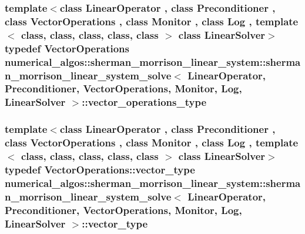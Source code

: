 \hypertarget{classnumerical__algos_1_1sherman__morrison__linear__system_1_1sherman__morrison__linear__system__solve_a737e301e18d9443d9aeb9a07ae87ef51}{
\subsubsection[{vector\-\_\-operations\-\_\-type}]{\setlength{\rightskip}{0pt plus 5cm}template$<$class Linear\-Operator , class Preconditioner , class Vector\-Operations , class Monitor , class Log , template$<$ class, class, class, class, class $>$ class Linear\-Solver$>$ typedef Vector\-Operations {\bf numerical\-\_\-algos\-::sherman\-\_\-morrison\-\_\-linear\-\_\-system\-::sherman\-\_\-morrison\-\_\-linear\-\_\-system\-\_\-solve}$<$ Linear\-Operator, Preconditioner, Vector\-Operations, Monitor, Log, Linear\-Solver $>$\-::{\bf vector\-\_\-operations\-\_\-type}}}\label{classnumerical__algos_1_1sherman__morrison__linear__system_1_1sherman__morrison__linear__system__solve_a737e301e18d9443d9aeb9a07ae87ef51}
\hypertarget{classnumerical__algos_1_1sherman__morrison__linear__system_1_1sherman__morrison__linear__system__solve_aec9272d97681f76dc772bee75ab3c3aa}{
\subsubsection[{vector\-\_\-type}]{\setlength{\rightskip}{0pt plus 5cm}template$<$class Linear\-Operator , class Preconditioner , class Vector\-Operations , class Monitor , class Log , template$<$ class, class, class, class, class $>$ class Linear\-Solver$>$ typedef Vector\-Operations\-::vector\-\_\-type {\bf numerical\-\_\-algos\-::sherman\-\_\-morrison\-\_\-linear\-\_\-system\-::sherman\-\_\-morrison\-\_\-linear\-\_\-system\-\_\-solve}$<$ Linear\-Operator, Preconditioner, Vector\-Operations, Monitor, Log, Linear\-Solver $>$\-::{\bf vector\-\_\-type}}}\label{classnumerical__algos_1_1sherman__morrison__linear__system_1_1sherman__morrison__linear__system__solve_aec9272d97681f76dc772bee75ab3c3aa}


